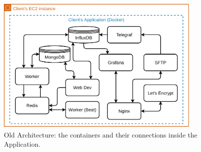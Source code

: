 \begin{figure}[!htbp]
    \centering
    \includegraphics[width=0.90\textwidth]{img/diagrams/pdf/old-arch-connections.drawio.pdf}
    \caption[Old Architecture's Containers]{Old Architecture: the containers and their connections inside the Application.}
    \label{fig:old-arch-connections}
\end{figure}
